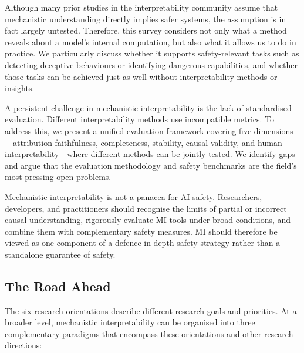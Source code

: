Although many prior studies in the interpretability community assume that mechanistic understanding directly implies safer systems, the assumption is in fact largely untested. Therefore, this survey considers not only what a method reveals about a model's internal computation, but also what it allows us to do in practice. We particularly discuss whether it supports safety-relevant tasks such as detecting deceptive behaviours or identifying dangerous capabilities, and whether those tasks can be achieved just as well without interpretability methods or insights.

A persistent challenge in mechanistic interpretability is the lack of standardised evaluation. Different interpretability methods use incompatible metrics. To address this, we present a unified evaluation framework covering five dimensions---attribution faithfulness, completeness, stability, causal validity, and human interpretability---where different methods can be jointly tested. We identify gaps and argue that the evaluation methodology and safety benchmarks are the field's most pressing open problems.

Mechanistic interpretability is not a panacea for AI safety. Researchers, developers, and practitioners should recognise the limits of partial or incorrect causal understanding, rigorously evaluate MI tools under broad conditions, and combine them with complementary safety measures. MI should therefore be viewed as one component of a defence-in-depth safety strategy rather than a standalone guarantee of safety.

\subsection{The Road Ahead}

The six research orientations describe different research goals and priorities. At a broader level, mechanistic interpretability can be organised into three complementary paradigms that encompass these orientations and other research directions:

